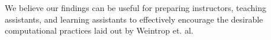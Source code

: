 \documentclass{msuphddissertation}
\begin{document}
\begin{doublespace}
We believe our findings can be useful for preparing instructors, teaching assistants, and learning assistants to effectively encourage the desirable computational practices laid out by Weintrop et. al.









\end{doublespace}
\end{document}
